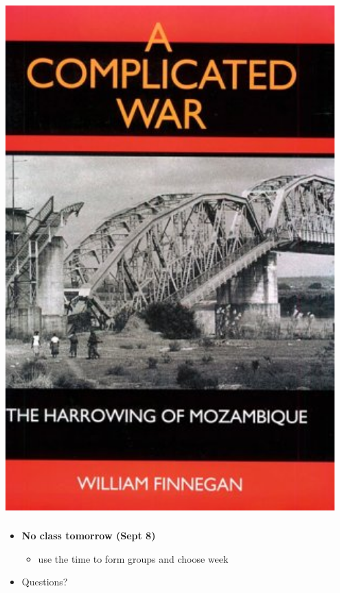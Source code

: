\documentclass[aspectratio=43]{beamer}
\begin{document}
\begin{frame}
\begin{minipage}{0.45\textwidth}
\includegraphics[width = 0.95\textwidth]{img/finnegan_mozambique}
\end{minipage}

\end{frame}

\begin{frame}
\frametitle{}
\centering

\begin{itemize}
  \item \textbf{No class tomorrow (Sept 8)}
  \begin{itemize}
    \item use the time to form groups and choose week
  \end{itemize}
  \item Questions?
\end{itemize}

\end{frame}
\end{document}
